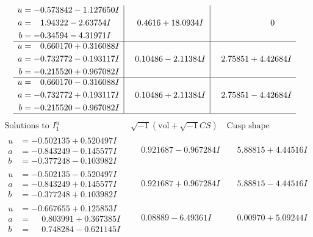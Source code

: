 \documentclass[1p]{elsarticle_modified}
\theoremstyle{definition}
\newcommand{\I}{\sqrt{-1}}
\begin{document}
$$\begin{array}{c|c|c}
\begin{aligned}
u &= -0.573842 - 1.127650 I \\
a &= \phantom{-}1.94322 - 2.63754 I \\
b &= -0.34594 - 4.31971 I\end{aligned}
 & \phantom{-}0.4616 + 18.0934 I & \phantom{-0.000000 } 0 \\ \hline\begin{aligned}
u &= \phantom{-}0.660170 + 0.316088 I \\
a &= -0.732772 - 0.193117 I \\
b &= -0.215520 + 0.967082 I\end{aligned}
 & \phantom{-}0.10486 - 2.11384 I & \phantom{-}2.75851 + 4.42684 I \\ \hline\begin{aligned}
u &= \phantom{-}0.660170 - 0.316088 I \\
a &= -0.732772 + 0.193117 I \\
b &= -0.215520 - 0.967082 I\end{aligned}
 & \phantom{-}0.10486 + 2.11384 I & \phantom{-}2.75851 - 4.42684 I\\
 \hline 
 \end{array}$$\newpage$$\begin{array}{c|c|c}  
\text{Solutions to }I^u_{1}& \I (\text{vol} + \sqrt{-1}CS) & \text{Cusp shape}\\
 \hline 
\begin{aligned}
u &= -0.502135 + 0.520497 I \\
a &= -0.843249 - 0.145577 I \\
b &= -0.377248 - 0.103982 I\end{aligned}
 & \phantom{-}0.921687 - 0.967284 I & \phantom{-}5.88815 + 4.44516 I \\ \hline\begin{aligned}
u &= -0.502135 - 0.520497 I \\
a &= -0.843249 + 0.145577 I \\
b &= -0.377248 + 0.103982 I\end{aligned}
 & \phantom{-}0.921687 + 0.967284 I & \phantom{-}5.88815 - 4.44516 I \\ \hline\begin{aligned}
u &= -0.667655 + 0.125853 I \\
a &= \phantom{-}0.803991 + 0.367385 I \\
b &= \phantom{-}0.748284 - 0.621145 I\end{aligned}
 & \phantom{-}0.08889 - 6.49361 I & \phantom{-}0.00970 + 5.09244 I \\ \hline\begin{aligned}

\end{aligned}
\end{array}$$
\end{document}
